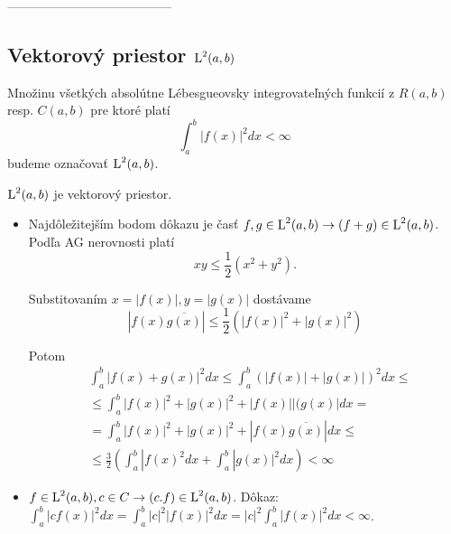 
---------------------------------------
\subsection{Vektorový priestor $\mbox{L}^2(a,b)$}

\begin{definicia}
    Množinu všetkých absolútne Lébesgueovsky integrovateľných 
    funkcií z $R(a,b)$ resp. $C(a,b)$ pre ktoré platí
    \begin{equation}
        \int_a^b |f(x)|^2 dx < \infty
    \end{equation}
    budeme označovať $\mbox{L}^2(a,b)$.
\end{definicia}

\begin{lema}
    $\mbox{L}^2(a,b)$ je vektorový priestor.
\end{lema}

\begin{dokaz}
\begin{itemize}
\item
    Najdôležitejším bodom dôkazu je časť 
    $f,g \in \mbox{L}^2(a,b) \rightarrow (f+g)\in \mbox{L}^2(a,b)$.
    Podľa AG nerovnosti platí 
    \begin{equation*}
        xy \le \frac{1}{2}(x^2 + y^2).
    \end{equation*}
    
    Substitovaním $x=|f(x)|,y=|g(x)|$ dostávame
    \begin{equation*}
        |f(x)\overline{g(x)}| \le \frac{1}{2} 
        ( |f(x)|^2 + |g(x)|^2)
    \end{equation*}
    
     Potom
    \begin{eqnarray*}
    & \int_a^b |f(x)+g(x)|^2 dx  \le
    \int_a^b (|f(x)|+|g(x)|)^2 dx \le \\    
    & \le  \int_a^b |f(x)|^2 + |g(x)|^2 + |f(x)||(g(x)| dx = \\
    & = \int_a^b |f(x)|^2 + |g(x)|^2 + |f(x) \overline{g(x)}| dx \le \\
    & \le \frac{3}{2}( \int_a^b |f(x)^2 dx + \int_a^b |g(x)|^2 dx)
    < \infty
    \end{eqnarray*}
\item
    $f \in \mbox{L}^2(a,b), c\in C \rightarrow (c.f) \in \mbox{L}^2(a,b)$.
    Dôkaz: $\int_a^b |cf(x)|^2 dx = \int_a^b |c|^2 |f(x)|^2 dx =
             |c|^2 \int_a^b |f(x)|^2 dx < \infty$.
\end{itemize}
\end{dokaz}

